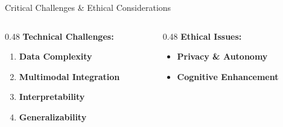 \documentclass[aspectratio=169]{beamer}
\begin{document}
\begin{frame}{Critical Challenges \& Ethical Considerations}
  \begin{columns}[T]
    \begin{column}{0.48\textwidth}
      \textbf{Technical Challenges:}
      \begin{enumerate}
        \item \textbf{Data Complexity} \cite{onciulArtificialIntelligenceNeuroscience2025}\\
        
        \item \textbf{Multimodal Integration} \cite{lorenziIntegrationMultimodalData2023}\\
        
        \item \textbf{Interpretability} \cite{sadeghiReviewExplainableArtificial2024}\\
        
        \item \textbf{Generalizability} \cite{johnsonPrecisionMedicineAI2021}\\
      \end{enumerate}
    \end{column}
    
    \begin{column}{0.48\textwidth}
      \textbf{Ethical Issues:} \cite{gordonEthicalConsiderationsUse2024}
      \begin{itemize}
        \item \textbf{Privacy \& Autonomy}
        
        \item \textbf{Cognitive Enhancement}
        

\end{itemize}
\end{column}
\end{columns}
\end{frame}
\end{document}
